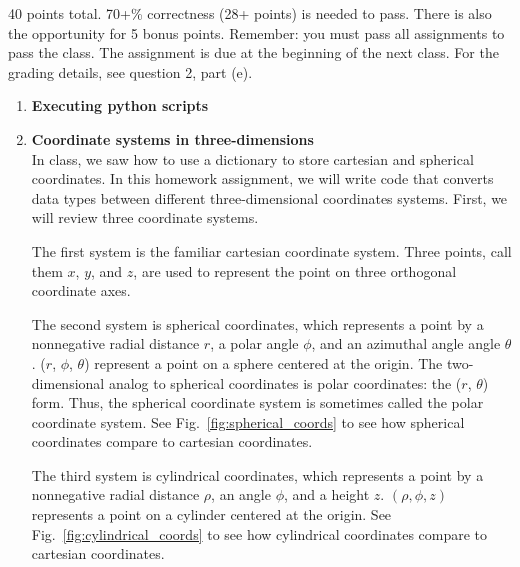 \documentclass{article}
\newcounter{points}
\begin{document}
\pagestyle{fancy}

40 points total.  70+\% correctness (28+ points) is needed to pass.  There is also the opportunity for 5 bonus points.  Remember: you must pass all assignments to pass the class.  The assignment is due at the beginning of the next class.  For the grading details, see question 2, part (e).

\begin{enumerate}
\item \textbf{Executing python scripts} \\

\item \textbf{Coordinate systems in three-dimensions} \\
In class, we saw how to use a dictionary to store cartesian and spherical coordinates.  In this homework assignment, we will write code that converts data types between different three-dimensional coordinates systems.  First, we will review three coordinate systems.

The first system is the familiar cartesian coordinate system.  Three points, call them $x$, $y$, and $z$, are used to represent the point on three orthogonal coordinate axes.

The second system is spherical coordinates, which represents a point by a nonnegative radial distance $r$, a polar angle $\phi$, and an azimuthal angle angle $\theta$.  ($r$, $\phi$, $\theta$) represent a point on a sphere centered at the origin.  The two-dimensional analog to spherical coordinates is polar coordinates: the ($r$, $\theta$) form.  Thus, the spherical coordinate system is sometimes called the polar coordinate system.  See Fig.~\ref{fig:spherical_coords} to see how spherical coordinates compare to cartesian coordinates.

The third system is cylindrical coordinates, which represents a point by a nonnegative radial distance $\rho$, an angle $\phi$, and a height $z$.  $(\rho, \phi, z)$ represents a point on a cylinder centered at the origin.  See Fig.~\ref{fig:cylindrical_coords} to see how cylindrical coordinates compare to cartesian coordinates.


\end{enumerate}
\end{document}
